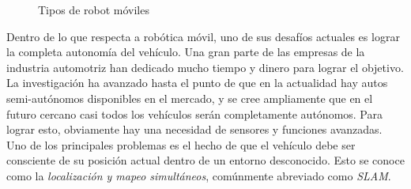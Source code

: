 \begin{figure}%
    \centering
    \qquad
    \qquad
    \qquad
    \qquad
    \caption{Tipos de robot móviles}
    \label{fig:mobilerobots}
\end{figure}

Dentro de lo que respecta a robótica móvil, uno de sus desafíos actuales es lograr la completa autonomía del vehículo. Una gran parte de las empresas de la industria automotriz han dedicado mucho tiempo y dinero para lograr el objetivo. La investigación ha avanzado hasta el punto de que en la actualidad hay autos semi-autónomos disponibles en el mercado, y se cree ampliamente que en el futuro cercano casi todos los vehículos serán completamente autónomos. Para lograr esto, obviamente hay una necesidad de sensores y funciones avanzadas. Uno de los principales problemas es el hecho de que el vehículo debe ser consciente de su posición actual dentro de un entorno desconocido. Esto se conoce como la \textit{localización y mapeo simultáneos}, comúnmente abreviado como \textit{SLAM}.

